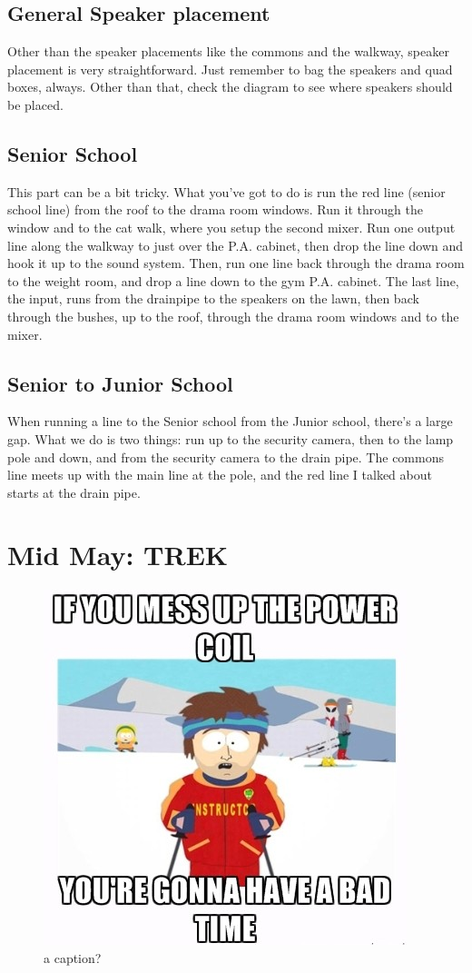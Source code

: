 \documentclass[letterpaper,10pt,oneside,headsepline]{scrreprt}
\begin{document}
\subsection{General Speaker placement}
Other than the speaker placements like the commons and the walkway, speaker placement is very straightforward. Just remember to bag the speakers and quad boxes, always. Other than that, check the diagram to see where speakers should be placed. 
\subsection{Senior School}
This part can be a bit tricky. What you've got to do is run the red line (senior school line) from the roof to the drama room windows. Run it through the window and to the cat walk, where you setup the second mixer. Run one output line along the walkway to just over the P.A. cabinet, then drop the line down and hook it up to the sound system. Then, run one line back through the drama room to the weight room, and drop a line down to the gym P.A. cabinet. The last line, the input, runs from the drainpipe to the speakers on the lawn, then back through the bushes, up to the roof, through the drama room windows and to the mixer.
\subsection{Senior to Junior School}
When running a line to the Senior school from the Junior school, there's a large gap. What we do is two things: run up to the security camera, then to the lamp pole and down, and from the security camera to the drain pipe. The commons line meets up with the main line at the pole, and the red line I talked about starts at the drain pipe. 

\section{Mid May: TREK}
\begin{figure}[ht]
\label{somepic}
\includegraphics[scale=.7]{bad_time}
\caption{a caption?}
\end{figure}
\end{document}
